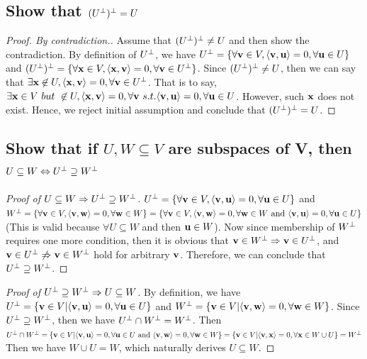 \documentclass[11pt,a4paper]{article}
\begin{document}
\subsection{Show that $(U^{\perp})^{\perp} = U$}
\begin{proof}[Proof. By contradiction.]
    Assume that $(U^{\perp})^{\perp} \not= U$ and then show the contradiction. 
    By definition of $U^{\perp}$, we have
    $ U^{\perp} = 
    \{\forall \mathbf{v} \in V, \langle \mathbf{v}, \mathbf{u} \rangle = 0, \forall \mathbf{u} \in U\}$
    and 
    $ (U^{\perp})^{\perp} = 
    \{\forall \mathbf{x} \in V, \langle \mathbf{x}, \mathbf{v} \rangle = 0, \forall \mathbf{v} \in U^{\perp}\}$.
    Since $(U^{\perp})^{\perp} \not= U$, then we can say that 
    $ \exists \mathbf{x} \not \in U, \langle \mathbf{x}, \mathbf{v} \rangle = 0, \forall
     \mathbf{v} \in U^{\perp} $. 
     That is to say, 
    $ \exists \mathbf{x} \in V\ but\ \not \in U, \langle \mathbf{x}, \mathbf{v} \rangle = 0, \forall
     \mathbf{v} \ s.t. \langle \mathbf{v}, \mathbf{u} \rangle = 0, \forall \mathbf{u} \in U$. 
     However, such $\mathbf{x}$ does not exist. Hence, we reject
     initial assumption and conclude that $(U^{\perp})^{\perp} = U$.
\end{proof}

\subsection{Show that if $U, W \subseteq V$ are subspaces of V, then $U
    \subseteq W \Leftrightarrow U^{\perp} \supseteq W^{\perp}$}
\begin{proof}[Proof of $U \subseteq W \Rightarrow U^{\perp} \supseteq W^{\perp}$]
    $U^{\perp} = 
    \{\forall \mathbf{v} \in V, \langle \mathbf{v}, \mathbf{u} \rangle = 0, \forall \mathbf{u} \in U\} $
    and
    $W^{\perp} = 
    \{\forall \mathbf{v} \in V, \langle \mathbf{v}, \mathbf{w} \rangle = 0, \forall \mathbf{w} \in W\} 
    = \{\forall \mathbf{v} \in V, \langle \mathbf{v}, \mathbf{w} \rangle = 0, \forall \mathbf{w}
        \in W\ \text{and } \langle \mathbf{v}, \mathbf{u} \rangle = 0, \forall \mathbf{u} \in U\} 
    $ (This is valid because $\forall U \subseteq W$ and then $\mathbf{u} \in W$).
    Now since membership of $W^{\perp}$ requires one more condition, then it is obvious that 
    $\mathbf{v} \in W^{\perp} \Rightarrow \mathbf{v} \in U^{\perp}$, and $\mathbf{v} \in
    U^{\perp} \not \Rightarrow \mathbf{v} \in W^{\perp}$ hold for arbitrary $\mathbf{v}$. Therefore,
    we can conclude that $U^{\perp} \supseteq W^{\perp}$.
\end{proof}
\begin{proof}[Proof of $U^{\perp} \supseteq W^{\perp} \Rightarrow U \subseteq W $]
    By definition, we have
    $ U^{\perp} = 
    \{\mathbf{v} \in V | \langle \mathbf{v}, \mathbf{u} \rangle = 0, \forall \mathbf{u} \in U\}$ and
    $W^{\perp} = 
    \{\mathbf{v} \in V | \langle \mathbf{v}, \mathbf{w} \rangle = 0, \forall \mathbf{w} \in W\}$.
    Since $U^{\perp} \supseteq W^{\perp}$, then we have $U^{\perp} \cap W^{\perp}  = W^{\perp}$. 
    Then 
    $
    U^{\perp} \cap W^{\perp} = \{\mathbf{v} \in V | \langle \mathbf{v}, \mathbf{u} \rangle = 0, \forall \mathbf{u} \in U
        \text{ and } \langle \mathbf{v}, \mathbf{w} \rangle = 0, \forall \mathbf{w} \in W\} 
    = \{ \mathbf{v} \in V | \langle \mathbf{v}, \mathbf{x} \rangle = 0, \forall \mathbf{x} \in W
        \cup U\} = W^{\perp}$
    Then we have $W \cup U = W$, which naturally derives $U \subseteq W$.
\end{proof}
\end{document}
